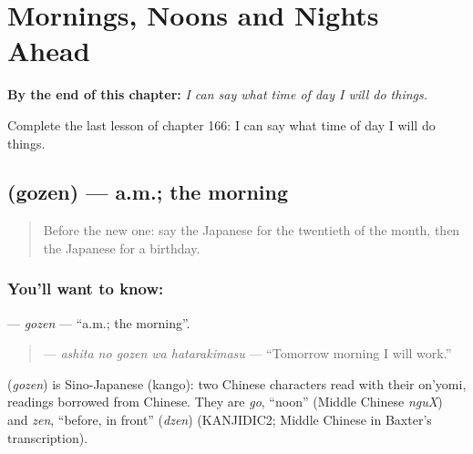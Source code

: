 
\chapter{Mornings, Noons and Nights Ahead}
\label{ch:ja-mornings-noons-and-nights-ahead}

\begin{chapteropening}
\textbf{By the end of this chapter:} \emph{I can say what time of day I will do things.}

Complete the last lesson of chapter 166: I can say what time of day I will do things.
\end{chapteropening}

\section[\texorpdfstring{\ja{ごぜん} (gozen)}{ごぜん (gozen)}]{ (gozen) — a.m.; the morning}

\label{lesson:JA-C166-gozen}



\begin{quote}
Before the new one: say the Japanese for the twentieth of the month, then the Japanese for a birthday.
\end{quote}

\subsection*{You'll want to know: }
\textbf{} — \emph{gozen} — \textquotedblleft{}a.m.; the morning\textquotedblright{}.

\begin{quote}
\textbf{  } — \emph{ashita no gozen wa hatarakimasu} — \textquotedblleft{}Tomorrow morning I will work.\textquotedblright{}
\end{quote}

\begin{cousinweb}
\textbf{} (\emph{gozen}) is Sino-Japanese (kango): two Chinese characters read with their on'yomi, readings borrowed from Chinese. They are \emph{go}, \textquotedblleft{}noon\textquotedblright{} (Middle Chinese \emph{nguX}) and \emph{zen}, \textquotedblleft{}before, in front\textquotedblright{} (\emph{dzen}) (KANJIDIC2; Middle Chinese in Baxter's transcription).
\end{cousinweb}

